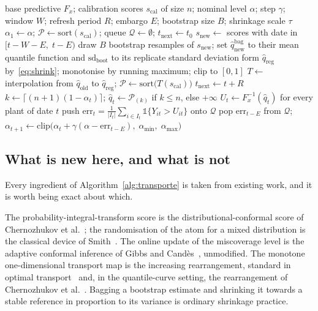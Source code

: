 \documentclass[preprint,3p,times]{elsarticle}
\begin{document}
\begin{algorithm}[t]
\caption{Transport + ACI with tail shrinkage. Constants and seeds in \ref{app:hiper}.}
\label{alg:transporte}
\begin{algorithmic}[1]
\Require base predictive $F_x$; calibration scores $s_{\mathrm{cal}}$ of size $n$; nominal level $\alpha$; step $\gamma$; window $W$; refresh period $R$; embargo $E$; bootstrap size $B$; shrinkage scale $\tau$
\State $\alpha_1\gets\alpha$; \; $\mathcal{P}\gets\mathrm{sort}(s_{\mathrm{cal}})$; \; queue $\mathcal{Q}\gets\emptyset$; \; $t_{\mathrm{next}}\gets t_0$
     \State $s_{\mathrm{new}}\gets$ scores with date in $[t-W-E,\;t-E)$
        \State draw $B$ bootstrap resamples of $s_{\mathrm{new}}$; set $\hat q^{\mathrm{bag}}_{\mathrm{new}}$ to their mean quantile function and $\mathrm{sd}_{\mathrm{boot}}$ to its replicate standard deviation
        \State form $\hat q_{\mathrm{reg}}$ by~\eqref{eq:shrink}; monotonise by running maximum; clip to $[0,1]$
        \State $T\gets$ interpolation from $\hat q_{\mathrm{old}}$ to $\hat q_{\mathrm{reg}}$; \; $\mathcal{P}\gets\mathrm{sort}\big(T(s_{\mathrm{cal}})\big)$
     \EndIf
     \State $t_{\mathrm{next}}\gets t+R$
  \EndIf
  \State $k\gets\lceil (n+1)(1-\alpha_t)\rceil$; \; $\hat q_t\gets \mathcal{P}_{(k)}$ if $k\le n$, else $+\infty$
  \State $U_t\gets F_x^{-1}(\hat q_t)$ for every plant of date $t$ 
  \State push $\mathrm{err}_t=\frac{1}{|I_t|}\sum_{i\in I_t}\mathbb{1}\{Y_{it}>U_{it}\}$ onto $\mathcal{Q}$
     \State pop $\mathrm{err}_{t-E}$ from $\mathcal{Q}$; \; $\alpha_{t+1}\gets\mathrm{clip}\big(\alpha_t+\gamma(\alpha-\mathrm{err}_{t-E}),\;\alpha_{\min},\;\alpha_{\max}\big)$
  \EndIf
\EndFor
\end{algorithmic}
\end{algorithm}

\subsection{What is new here, and what is not}
\label{sec:novedad}

Every ingredient of Algorithm~\ref{alg:transporte} is taken from existing work, and it is worth being exact about which.

The probability-integral-transform score is the distributional-conformal score of Chernozhukov et al.~\cite{chernozhukov2021}; the randomisation of the atom for a mixed distribution is the classical device of Smith~\cite{smith1985}. The online update of the miscoverage level is the adaptive conformal inference of Gibbs and Cand\`es~\cite{gibbs2021}, unmodified. The monotone one-dimensional transport map is the increasing rearrangement, standard in optimal transport~\cite{peyre2019} and, in the quantile-curve setting, the rearrangement of Chernozhukov et al.~\cite{chernozhukov2010}. Bagging a bootstrap estimate and shrinking it towards a stable reference in proportion to its variance is ordinary shrinkage practice.
\end{document}
